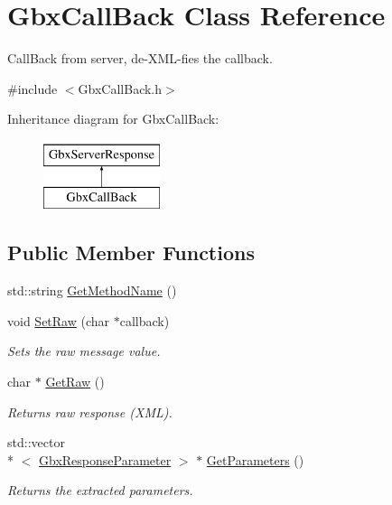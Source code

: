 \hypertarget{classGbxCallBack}{\section{Gbx\-Call\-Back Class Reference}
\label{classGbxCallBack}
}


Call\-Back from server, de-\/\-X\-M\-L-\/fies the callback.  




{\ttfamily \#include $<$Gbx\-Call\-Back.\-h$>$}

Inheritance diagram for Gbx\-Call\-Back\-:\begin{figure}[H]
\begin{center}
\leavevmode
\includegraphics[height=2.000000cm]{classGbxCallBack}
\end{center}
\end{figure}
\subsection*{Public Member Functions}
\begin{DoxyCompactItemize}
\item 
std\-::string \hyperlink{classGbxCallBack_aaf01544527ca0559478221780b3f32f6}{Get\-Method\-Name} ()
\item 
void \hyperlink{classGbxCallBack_a78a993170ce1e3c5a35f02088e4f66a0}{Set\-Raw} (char $\ast$callback)
\begin{DoxyCompactList}\small\item\em Sets the raw message value. \end{DoxyCompactList}\item 
char $\ast$ \hyperlink{classGbxServerResponse_a3105f299a4f6a0d997f909415a467fd5}{Get\-Raw} ()
\begin{DoxyCompactList}\small\item\em Returns raw response (X\-M\-L). \end{DoxyCompactList}\item 
std\-::vector\\*
$<$ \hyperlink{classGbxResponseParameter}{Gbx\-Response\-Parameter} $>$ $\ast$ \hyperlink{classGbxServerResponse_ab791b8d9edb964b909d3c70753549668}{Get\-Parameters} ()
\begin{DoxyCompactList}\small\item\em Returns the extracted parameters. \end{DoxyCompactList}\end{DoxyCompactItemize}

